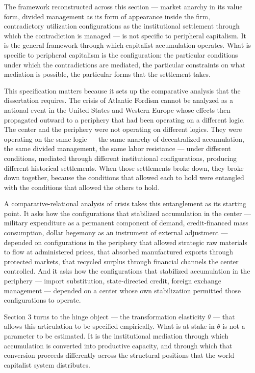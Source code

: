 The framework reconstructed across this section — market anarchy in its value form, divided management as its form of appearance inside the firm, contradictory utilization configurations as the institutional settlement through which the contradiction is managed — is not specific to peripheral capitalism. It is the general framework through which capitalist accumulation operates. What is specific to peripheral capitalism is the configuration: the particular conditions under which the contradictions are mediated, the particular constraints on what mediation is possible, the particular forms that the settlement takes.

This specification matters because it sets up the comparative analysis that the dissertation requires. The crisis of Atlantic Fordism cannot be analyzed as a national event in the United States and Western Europe whose effects then propagated outward to a periphery that had been operating on a different logic. The center and the periphery were not operating on different logics. They were operating on the same logic — the same anarchy of decentralized accumulation, the same divided management, the same labor resistance — under different conditions, mediated through different institutional configurations, producing different historical settlements. When those settlements broke down, they broke down together, because the conditions that allowed each to hold were entangled with the conditions that allowed the others to hold.

A comparative-relational analysis of crisis takes this entanglement as its starting point. It asks how the configurations that stabilized accumulation in the center — military expenditure as a permanent component of demand, credit-financed mass consumption, dollar hegemony as an instrument of external adjustment — depended on configurations in the periphery that allowed strategic raw materials to flow at administered prices, that absorbed manufactured exports through protected markets, that recycled surplus through financial channels the center controlled. And it asks how the configurations that stabilized accumulation in the periphery — import substitution, state-directed credit, foreign exchange management — depended on a center whose own stabilization permitted those configurations to operate.

Section 3 turns to the hinge object — the transformation elasticity $\theta$ — that allows this articulation to be specified empirically. What is at stake in $\theta$ is not a parameter to be estimated. It is the institutional mediation through which accumulation is converted into productive capacity, and through which that conversion proceeds differently across the structural positions that the world capitalist system distributes.

